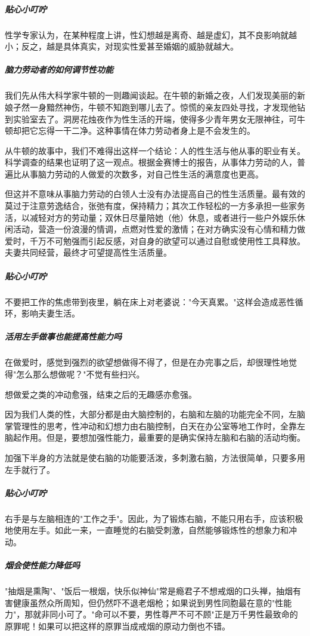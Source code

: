 \subparagraph{贴心小叮咛}

性学专家认为，在某种程度上讲，性幻想越是离奇、越是虚幻，其不良影响就越小；反之，越是具体真实，对现实性爱甚至婚姻的威胁就越大。

\subparagraph{脑力劳动者的如何调节性功能}

我们先从伟大科学家牛顿的一则趣闻谈起。在牛顿的新婚之夜，人们发现美丽的新娘孑然一身黯然神伤，牛顿不知跑到哪儿去了。惊慌的亲友四处寻找，才发现他钻到实验室去了。洞房花烛夜作为性生活的开端，使得多少青年男女无限神往，可牛顿却把它忘得一干二净。这种事情在体力劳动者身上是不会发生的。

从牛顿的故事中，我们不难得出这样一个结论：人的性生活与他从事的职业有关。科学调查的结果也证明了这一观点。根据金赛博士的报告，从事体力劳动的人，普遍比从事脑力劳动的人做爱的次数多，对自己性生活的满意度也更高。

但这并不意味从事脑力劳动的白领人士没有办法提高自己的性生活质量。最有效的莫过于注意劳逸结合，张弛有度，保持精力；其次工作轻松的一方多承担一些家务活，以减轻对方的劳动量；双休日尽量陪她（他）休息，或者进行一些户外娱乐休闲活动，营造一份浪漫的情调，点燃对性爱的激情；在对方确实没有心情和精力做爱时，千万不可勉强而引起反感，对自身的欲望可以通过自慰或使用性工具释放。夫妻共同经营，最终才可望提高性生活质量。

\subparagraph{贴心小叮咛}

不要把工作的焦虑带到夜里，躺在床上对老婆说："今天真累。"这样会造成恶性循环，影响夫妻生活。

\subparagraph{活用左手做事也能提高性能力吗}

在做爱时，感觉到强烈的欲望想做得不得了，但是在办完事之后，却很理性地觉得"怎么那么想做呢？"不觉有些扫兴。

想做爱之类的冲动愈强，结束之后的无趣感亦愈强。

因为我们人类的性，大部分都是由大脑控制的，右脑和左脑的功能完全不同，左脑掌管理性的思考，性冲动和幻想力由右脑控制，白天在办公室等地工作时，全靠左脑起作用。但是，要想加强性能力，最重要的是确实保持左脑和右脑的活动均衡。

加强下半身的方法就是使右脑的功能要活泼，多刺激右脑，方法很简单，只要多用左手就行了。

\subparagraph{贴心小叮咛}

右手是与左脑相连的"工作之手"。因此，为了锻炼右脑，不能只用右手，应该积极地使用左手。如此一来，一直睡觉的右脑受刺激，自然能够锻炼性的想象力和冲动。

\subparagraph{烟会使性能力降低吗}

"抽烟是熏陶"、"饭后一根烟，快乐似神仙"常是瘾君子不想戒烟的口头禅，抽烟有害健康虽然众所周知，但仍然吓不退老烟枪；如果说到男性同胞最在意的"性能力"，那就非同小可了。"命可以不要，男性尊严不可不顾"正是万千男性最致命的原罪呢！如果可以把这样的原罪当成戒烟的原动力倒也不错。

